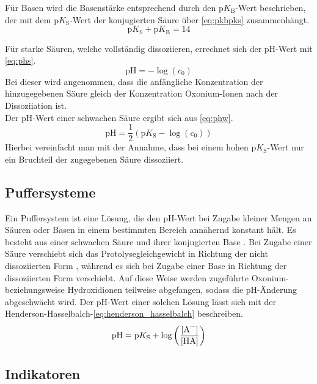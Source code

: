 Für Basen wird die Basenstärke entsprechend durch den $\text{p}K_{\text{B}}$-Wert beschrieben, der mit dem $\text{p}K_{\text{S}}$-Wert der konjugierten Säure über \eqref{eq:pkbpks} zusammenhängt.
\begin{equation}
    \text{p}K_{\text{S}}+\text{p}K_{\text{B}}=14\label{eq:pkbpks}
\end{equation}

Für starke Säuren, welche vollständig dissoziieren, errechnet sich der pH-Wert mit \eqref{eq:phs}.
\begin{equation}
    \text{pH}=-\log(c_{0})\label{eq:phs}
\end{equation}
Bei dieser wird angenommen, dass die anfängliche Konzentration der hinzugegebenen Säure gleich der Konzentration Oxonium-Ionen nach der Dissoziiation ist.\\

Der pH-Wert einer schwachen Säure ergibt sich aus \eqref{eq:phw}. \cite{skript}
\begin{equation}
    \text{pH}=\frac{1}{2}(\text{p}K_{\text{S}}-\log(c_{0}))\label{eq:phw}
\end{equation}
Hierbei vereinfacht man mit der Annahme, dass bei einem hohen $\text{p}K_{\text{S}}$-Wert nur ein Bruchteil der zugegebenen Säure dissoziiert.


\subsection{Puffersysteme}

Ein Puffersystem ist eine Lösung, die den pH-Wert bei Zugabe kleiner Mengen an Säuren oder Basen in einem bestimmten Bereich annähernd konstant hält. Es besteht aus einer schwachen Säure  und ihrer konjugierten Base . Bei Zugabe einer Säure verschiebt sich das Protolysegleichgewicht in Richtung der nicht dissoziierten Form , während es sich bei Zugabe einer Base in Richtung der dissoziierten Form  verschiebt. Auf diese Weise werden zugeführte Oxonium- beziehungsweise Hydroxidionen teilweise abgefangen, sodass die pH-Änderung abgeschwächt wird. Der pH-Wert einer solchen Lösung lässt sich mit der Henderson-Hasselbalch-\eqref{eq:henderson_hasselbalch} beschreiben. \cite{skript}
\begin{equation}
    \mathrm{pH} = \mathrm{p}K_\mathrm{S} + \log \left(\frac{[\ce{A^-}]}{[\ce{HA}]}\right)
    \label{eq:henderson_hasselbalch}
\end{equation}


\subsection{Indikatoren}

